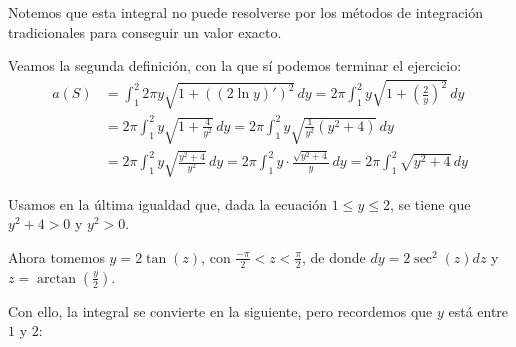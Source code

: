 Notemos que esta integral no puede resolverse por los métodos de integración tradicionales para conseguir un valor exacto.

Veamos la segunda definición, con la que sí podemos terminar el ejercicio:
{\small
\[
\begin{aligned}
a(S) &= \int_{1}^{2} 2\pi y \sqrt{1 + \left( (2\ln y)' \right)^2} \, dy = 2\pi \int_{1}^{2} y \sqrt{1 + \left( \frac{2}{y} \right)^2} \, dy \\
     &= 2\pi \int_{1}^{2} y \sqrt{1 + \frac{4}{y^2}} \, dy = 2\pi \int_{1}^{2} y \sqrt{ \frac{1}{y^2} (y^2 + 4) } \, dy \\
     &= 2\pi \int_{1}^{2} y \sqrt{ \frac{y^2 + 4}{y^2} } \, dy = 2\pi \int_{1}^{2} y \cdot \frac{ \sqrt{y^2 + 4} }{y} \, dy = 2\pi \int_{1}^{2} \sqrt{y^2 + 4} \, dy
\end{aligned}
\]
}



Usamos en la \'ultima igualdad que, dada la ecuación $1\leq y\leq 2$, se tiene que $y^{2}+4>0$ y $y^{2}>0$.

Ahora tomemos $y=2\tan (z)$, con $\frac{-\pi }{2}<z<\frac{\pi }{2}$, de donde $dy=2\sec
^{2}\left( z\right) dz$ y $z=\arctan \left( \frac{y}{2}\right)$. 

Con ello, la integral se convierte en la siguiente, pero recordemos que $y$ está entre $1$ y $2$:

